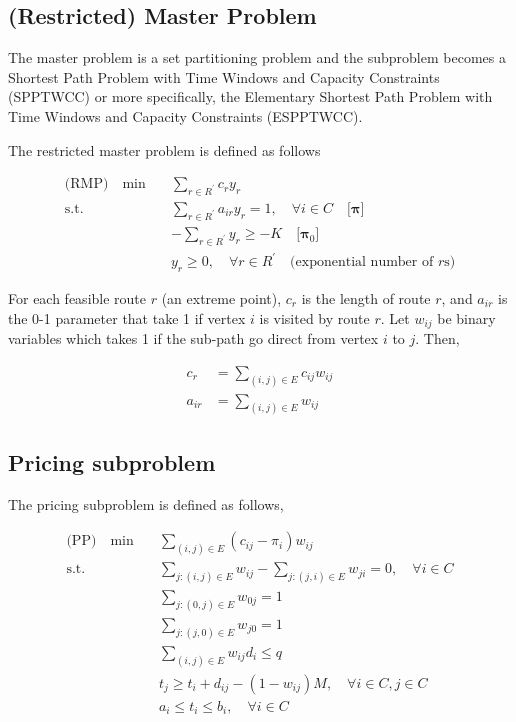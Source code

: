         \subsection{(Restricted) Master Problem}
            The master problem is a set partitioning problem and the subproblem becomes a Shortest Path Problem with Time Windows and Capacity Constraints (SPPTWCC) or more specifically, the Elementary Shortest Path Problem with Time Windows and Capacity Constraints (ESPPTWCC). 
            
            The restricted master problem is defined as follows

            \begin{align*}
                \text{(RMP)} \quad \min \quad & \sum_{r \in R^\prime} c_r y_r\\
                \text{s.t.} \quad & \sum_{r \in R^\prime} a_{ir} y_r = 1, \quad \forall i \in C \quad \text{[$\mathbf{\pi}$]}\\
                & -\sum_{r\in R^\prime} y_r \ge -K  \quad \text{[$\mathbf{\pi}_0$]} \\
                & y_r \ge 0, \quad \forall r \in R^\prime \quad \text{(exponential number of $r$s)}
            \end{align*}

            For each feasible route $r$ (an extreme point), $c_r$ is the length of route $r$, and $a_{ir}$ is the 0-1 parameter that take 1 if vertex $i$ is visited by route $r$. Let $w_{ij}$ be binary variables which takes 1 if the sub-path go direct from vertex $i$ to $j$. Then,

            \begin{align*}
                c_r &= \sum_{(i, j) \in E} c_{ij} w_{ij} \\
                a_{ir} &= \sum_{(i, j) \in E} w_{ij}
            \end{align*}

        \subsection{Pricing subproblem}
            The pricing subproblem is defined as follows,

            \begin{align*}
                \text{(PP)} \quad \min \quad & \sum_{(i, j) \in E}(c_{ij} - \pi_i) w_{ij} \\
                \text{s.t.} \quad & \sum_{j: (i, j) \in E} w_{ij} - \sum_{j: (j, i) \in E} w_{ji} = 0, \quad \forall i \in C\\
                & \sum_{j: (0, j) \in E} w_{0j} = 1 \\
                & \sum_{j: (j, 0) \in E} w_{j0} = 1 \\
                & \sum_{(i, j) \in E} w_{ij} d_i \le q \\
                & t_j \ge t_i + d_{ij} - (1 - w_{ij}) M, \quad \forall i \in C, j \in C\\
                & a_i \le t_i \le b_i, \quad \forall i \in C
            \end{align*}

